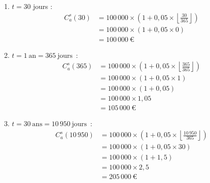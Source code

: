 \documentclass{article}
\begin{document}
\begin{enumerate}[label=\textbf{R1.\arabic*}]
\begin{enumerate}[label=(\alph*)]
                    \item \( t = 30 \) jours : 
                    \begin{align*}
                        C_a^s(30) & = 100\,000 \times \left(1 + 0,05 \times \left\lfloor \frac{30}{365} \right\rfloor \right) \\
                        & = 100\,000 \times \left(1 + 0,05 \times 0 \right)                                         \\
                        & = \boxed{100\,000\ \text{€}}                                                            
                    \end{align*}

                    \item $t = 1\ \text{an} = 365\ \text{jours}$~: 
                    \begin{align*}
                        C_a^s(365) & = 100\,000 \times \left(1 + 0,05 \times \left\lfloor \frac{365}{365} \right\rfloor \right) \\
                        & = 100\,000 \times \left(1 + 0,05 \times 1 \right)                                          \\
                        & = 100\,000 \times \left(1 + 0,05 \right)                                                   \\
                        & = 100\,000 \times 1,05                                                                     \\
                        & = \boxed{105\,000\ \text{€}}                                                             
                    \end{align*}

                    \item $t = 30\ \text{ans} = 10\,950\ \text{jours}$~: 
                    \begin{align*}
                        C_a^s(10\,950) & = 100\,000 \times \left(1 + 0,05 \times \left\lfloor \frac{10\,950}{365} \right\rfloor \right) \\
                        & = 100\,000 \times \left(1 + 0,05 \times 30 \right)                                             \\
                        & = 100\,000 \times \left(1 + 1,5 \right)                                                        \\
                        & = 100\,000 \times 2,5                                                                          \\
                        & = \boxed{205\,000\ \text{€}}                                                                 
                    \end{align*}
                \end{enumerate}


\end{enumerate}
\end{document}
